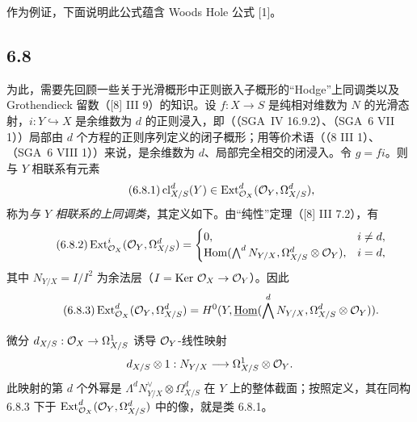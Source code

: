 作为例证，下面说明此公式蕴含 Woods Hole 公式 [1]。

\subsection*{6.8}
为此，需要先回顾一些关于光滑概形中正则嵌入子概形的“Hodge”上同调类以及 Grothendieck 留数（[8] III 9）的知识。设 $f:X\to S$ 是纯相对维数为 $N$ 的光滑态射，$i:Y\hookrightarrow X$ 是余维数为 $d$ 的正则浸入，即（（SGA~IV 16.9.2）、（SGA~6 VII 1））局部由 $d$ 个方程的正则序列定义的闭子概形；用等价术语（（8 III 1）、（SGA~6 VIII 1））来说，是余维数为 $d$、局部完全相交的闭浸入。令 $g=fi$。则与 $Y$ 相联系有元素
\begin{equation}
\tag{6.8.1}
\operatorname{cl}^d_{X/S}(Y)\in\operatorname{Ext}^d_{\mathcal{O}_X}(\mathcal{O}_Y,\Omega^d_{X/S}),
\end{equation}
称为\emph{与 $Y$ 相联系的上同调类}，其定义如下。由“纯性”定理（[8] III 7.2），有
\begin{equation}
\tag{6.8.2}
\operatorname{Ext}^i_{\mathcal{O}_X}(\mathcal{O}_Y,\Omega^d_{X/S})=
\begin{cases}
0,& i\ne d,\\
\operatorname{Hom}(\bigwedge^d N_{Y/X},\Omega^d_{X/S}\otimes\mathcal{O}_Y),& i=d,
\end{cases}
\end{equation}
其中 $N_{Y/X}=I/I^2$ 为余法层（$I=\operatorname{Ker}\,\mathcal{O}_X\to\mathcal{O}_Y$）。因此
\begin{equation}
\tag{6.8.3}
\operatorname{Ext}^d_{\mathcal{O}_X}(\mathcal{O}_Y,\Omega^d_{X/S})=H^0(Y,\underline{\operatorname{Hom}}(\bigwedge^dN_{Y/X},\Omega^d_{X/S}\otimes\mathcal{O}_Y)).
\end{equation}

微分 $d_{X/S}:\mathcal{O}_X\to\Omega^1_{X/S}$ 诱导 $\mathcal{O}_Y$-线性映射
\[
d_{X/S}\otimes 1:N_{Y/X}\longrightarrow \Omega^1_{X/S}\otimes\mathcal{O}_Y.
\]
此映射的第 $d$ 个外幂是 $\Lambda^d N_{Y/X}^{\vee}\otimes\Omega^d_{X/S}$ 在 $Y$ 上的整体截面；按照定义，其在同构 6.8.3 下于 $\operatorname{Ext}^d_{\mathcal{O}_X}(\mathcal{O}_Y,\Omega^d_{X/S})$ 中的像，就是类 6.8.1。

